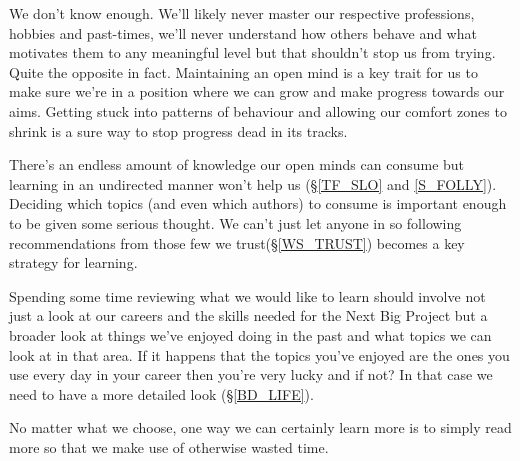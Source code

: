 \cleardoublepage
{\small

We don't know enough. We'll likely never master our respective professions, hobbies and past-times, we'll never understand how others behave and what motivates them to any meaningful level but that shouldn't stop us from trying. Quite the opposite in fact. Maintaining an open mind is a key trait for us to make sure we're in a position where we can grow and make progress towards our aims. Getting stuck into patterns of behaviour and allowing our comfort zones to shrink is a sure way to stop progress dead in its tracks.

There's an endless amount of knowledge our open minds can consume but learning in an undirected manner won't help us (\S  \ref{TF_SLO} and \ref{S_FOLLY}). 
Deciding which topics (and even which authors) to consume is important enough to be given some serious thought. We can't just let anyone in so following recommendations from those few we trust(\S \ref{WS_TRUST}) becomes a key strategy for learning.

Spending some time reviewing what we would like to learn should involve not just a look at our careers and the skills needed for the Next Big Project but a broader look at things we've enjoyed doing in the past and what topics we can look at in that area. If it happens that the topics you've enjoyed are the ones you use every day in your career then you're very lucky and if not? In that case we need to have a more detailed look (\S \ref{BD_LIFE}).

No matter what we choose, one way we can certainly learn more is to simply read more so that we make use of otherwise wasted time. 

}
